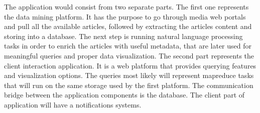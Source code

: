 The application would consist from two separate parts. The first one represents the data mining platform. It has the purpose to go through media web portals and pull all the available articles, followed by extracting the articles content and storing into a database. The next step is running natural language processing tasks in order to enrich the articles with useful metadata, that are later used for meaningful queries and proper data visualization. The second part represents the client interaction application. It is a web platform that provides querying features and visualization options. The queries most likely will represent mapreduce tasks that will run on the same storage used by the first platform. The communication bridge between the application components is the database. The client part of application will have a notifications systems.

\clearpage